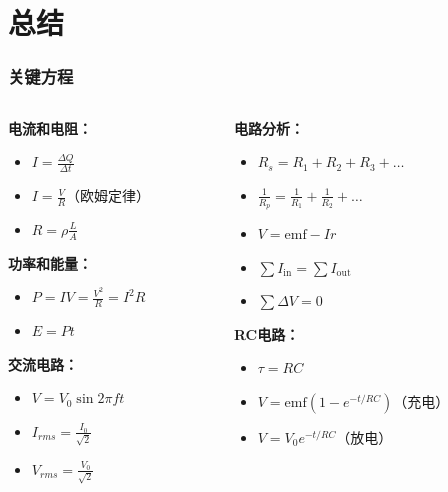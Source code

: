 \documentclass{beamer}
\begin{document}
\section{总结}
\begin{frame}
    \frametitle{关键方程}
    \begin{columns}
        \begin{column}{0.5\textwidth}
            \textbf{电流和电阻：}
            \begin{itemize}
                \item $I = \frac{\Delta Q}{\Delta t}$
                \item $I = \frac{V}{R}$（欧姆定律）
                \item $R = \rho\frac{L}{A}$
            \end{itemize}
            
            \textbf{功率和能量：}
            \begin{itemize}
                \item $P = IV = \frac{V^2}{R} = I^2R$
                \item $E = Pt$
            \end{itemize}
            
            \textbf{交流电路：}
            \begin{itemize}
                \item $V = V_0 \sin 2\pi ft$
                \item $I_{rms} = \frac{I_0}{\sqrt{2}}$
                \item $V_{rms} = \frac{V_0}{\sqrt{2}}$
            \end{itemize}
        \end{column}
        \begin{column}{0.5\textwidth}
            \textbf{电路分析：}
            \begin{itemize}
                \item $R_s = R_1 + R_2 + R_3 + \ldots$
                \item $\frac{1}{R_p} = \frac{1}{R_1} + \frac{1}{R_2} + \ldots$
                \item $V = \text{emf} - Ir$
                \item $\sum I_{\text{in}} = \sum I_{\text{out}}$
                \item $\sum \Delta V = 0$
            \end{itemize}
            
            \textbf{RC电路：}
            \begin{itemize}
                \item $\tau = RC$
                \item $V = \text{emf}(1-e^{-t/RC})$（充电）
                \item $V = V_0e^{-t/RC}$（放电）
            \end{itemize}
            

\end{column}
\end{columns}
\end{frame}
\end{document}
